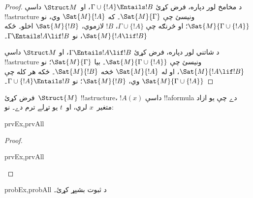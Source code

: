 \documentclass[../../../include/open-logic-section]{subfiles}
\begin{document}
\begin{proof}
د مخامخ لور دپاره، فرض کړئ
$\Gamma \cup \{ !A \} \Entails !B$، او~$\Struct M$ داسې
!!a{structure} ونيسئ چې $\Sat{M}{\Gamma}$۔ که $\Sat{M}{!A}$ وي، نو
$\Sat{M}{\Gamma \cup \{ !A \} }$؛ او څرنګه چې
$\Gamma \cup \{ !A \}$، $!B$ لازموي، $\Sat{M}{!B}$ اخلو۔ ځکه
$\Sat{M}{!A \lif !B}$، نو $\Gamma \Entails !A \lif !B$۔

د شاتني لور دپاره، فرض کړئ $\Gamma \Entails !A \lif !B$، او
$\Struct M$ داسې !!a{structure} ونيسئ چې
$\Sat{M}{\Gamma \cup \{ !A \}}$۔ بيا $\Sat{M}{\Gamma}$؛ نو
$\Sat{M}{!A \lif !B}$، او له $\Sat{M}{!A}$ څخه $\Sat{M}{!B}$۔
ځکه هر کله چې $\Sat{M}{\Gamma \cup \{ !A \} }$ وي،
$\Sat{M}{!B}$؛ نو $\Gamma \cup \{ !A \} \Entails !B$۔
\end{proof}

\begin{prop}
  فرض کړئ~$\Struct{M}$ !!a{structure}، $!A(x)$ داسې !!a{formula} دے
  چې يو ازاد متغير~$x$ لري، او~$t$ يو تړلے ترم دے۔ نو:
  \begin{tagenumerate}{prvEx,prvAll}
  \end{tagenumerate}
\end{prop}

\begin{proof}
  \begin{tagenumerate}{prvEx,prvAll}
  \end{tagenumerate}
\end{proof}

\begin{probtag}{probEx,probAll}
  د  ثبوت بشپړ کړئ۔
\end{probtag}
\end{document}
